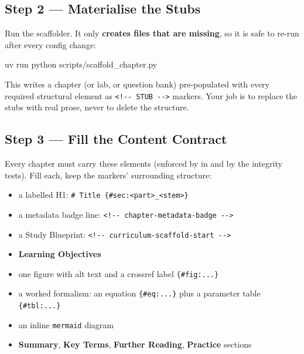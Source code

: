 \documentclass[
]{article}
\newenvironment{Shaded}{}{}
\newcommand{\ExtensionTok}[1]{#1}
\newcommand{\NormalTok}[1]{#1}
\providecommand{\tightlist}{%
  \setlength{\itemsep}{0pt}\setlength{\parskip}{0pt}}
\theoremstyle{plain}
\theoremstyle{definition}
\begin{document}
\subsection{Step 2 --- Materialise the
Stubs}\label{step-2-materialise-the-stubs}

Run the scaffolder. It only \textbf{creates files that are missing}, so
it is safe to re-run after every config change:

\begin{Shaded}
\begin{Highlighting}[]
\ExtensionTok{uv}\NormalTok{ run python scripts/scaffold\_chapter.py}
\end{Highlighting}
\end{Shaded}

This writes a chapter (or lab, or question bank) pre-populated with
every required structural element as
\texttt{\textless{}!-\/-\ STUB\ -\/-\textgreater{}} markers. Your job is
to replace the stubs with real prose, never to delete the structure.

\subsection{Step 3 --- Fill the Content
Contract}\label{step-3-fill-the-content-contract}

Every chapter must carry these elements (enforced by
 in  and by
the integrity tests). Fill each, keep the markers' surrounding
structure:

\begin{itemize}
\tightlist
\item
  a labelled H1:
  \texttt{\#\ Title\ \{\#sec:\textless{}part\textgreater{}\_\textless{}stem\textgreater{}\}}
\item
  a metadata badge line:
  \texttt{\textless{}!-\/-\ chapter-metadata-badge\ -\/-\textgreater{}}
\item
  a Study Blueprint:
  \texttt{\textless{}!-\/-\ curriculum-scaffold-start\ -\/-\textgreater{}}
\item
  \textbf{Learning Objectives}
\item
  one figure with alt text and a crossref label \texttt{\{\#fig:...\}}
\item
  a worked formalism: an equation \texttt{\{\#eq:...\}} plus a parameter
  table \texttt{\{\#tbl:...\}}
\item
  an inline
  \texttt{\textasciigrave{}\textasciigrave{}\textasciigrave{}mermaid}
  diagram
\item
  \textbf{Summary}, \textbf{Key Terms}, \textbf{Further Reading},
  \textbf{Practice} sections
\end{itemize}
\end{document}
